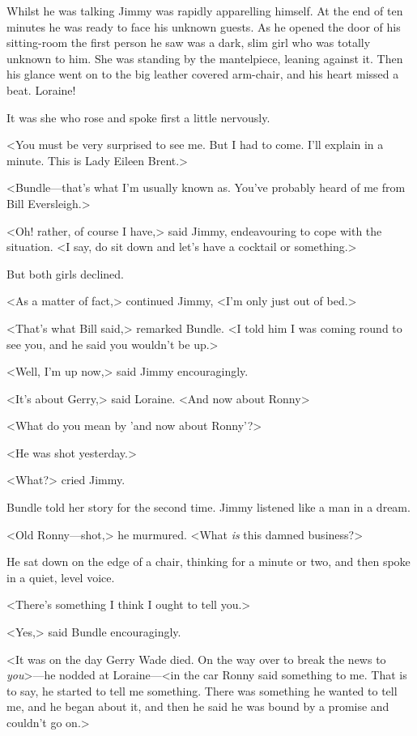 Whilst he was talking Jimmy was rapidly apparelling himself. At the end of ten minutes he was ready to face his unknown guests. As he opened the door of his sitting-room the first person he saw was a dark, slim girl who was totally unknown to him. She was standing by the mantelpiece, leaning against it. Then his glance went on to the big leather covered arm-chair, and his heart missed a beat. Loraine!

It was she who rose and spoke first a little nervously.

<You must be very surprised to see me. But I had to come. I'll explain in a minute. This is Lady Eileen Brent.>

<Bundle—that's what I'm usually known as. You've probably heard of me from Bill Eversleigh.>

<Oh! rather, of course I have,> said Jimmy, endeavouring to cope with the situation. <I say, do sit down and let's have a cocktail or something.>

But both girls declined.

<As a matter of fact,> continued Jimmy, <I'm only just out of bed.>

<That's what Bill said,> remarked Bundle. <I told him I was coming round to see you, and he said you wouldn't be up.>

<Well, I'm up now,> said Jimmy encouragingly.

<It's about Gerry,> said Loraine. <And now about Ronny\longdash>

<What do you mean by 'and now about Ronny'?>

<He was shot yesterday.>

<What?> cried Jimmy.

Bundle told her story for the second time. Jimmy listened like a man in a dream.

<Old Ronny—shot,> he murmured. <What \emph{is} this damned business?>

He sat down on the edge of a chair, thinking for a minute or two, and then spoke in a quiet, level voice.

<There's something I think I ought to tell you.>

<Yes,> said Bundle encouragingly.

<It was on the day Gerry Wade died. On the way over to break the news to \emph{you}>—he nodded at Loraine—<in the car Ronny said something to me. That is to say, he started to tell me something. There was something he wanted to tell me, and he began about it, and then he said he was bound by a promise and couldn't go on.>

